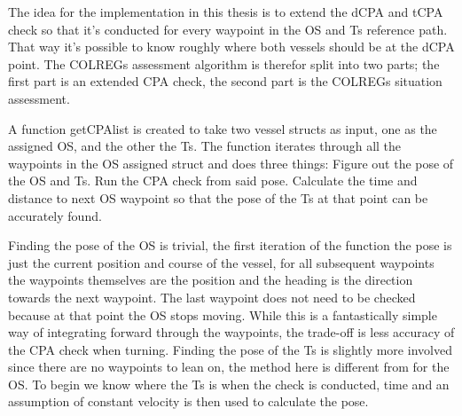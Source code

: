 The idea for the implementation in this thesis is to extend the \gls{dCPA} and \gls{tCPA} check so that it's conducted for every waypoint in the \gls{OS} and \gls{Ts} reference path.
That way it's possible to know roughly where both vessels should be at the \gls{dCPA} point. The COLREGs assessment
algorithm is therefor split into two parts; the first part is an extended CPA check, the second part is the COLREGs situation assessment. 

A function getCPAlist is created to take two vessel structs as input, one as the assigned \gls{OS}, and the other the \gls{Ts}. The function iterates through all the waypoints
in the \gls{OS} assigned struct and does three things:\newline
Figure out the pose of the \gls{OS} and \gls{Ts}.\newline
Run the CPA check from said pose.\newline
Calculate the time and distance to next \gls{OS} waypoint so that the pose of the \gls{Ts} at that point can be accurately found.

Finding the pose of the \gls{OS} is trivial, the first iteration of the function the pose is just the current position and course of the vessel, for all
subsequent waypoints the waypoints themselves are the position and the heading is the direction towards the next waypoint. The last waypoint does not need to be checked
because at that point the \gls{OS} stops moving. While this is a fantastically simple way of integrating forward through the waypoints, the trade-off is less accuracy of the CPA check
when turning. 
Finding the pose of the \gls{Ts} is slightly more involved since there are no waypoints to lean on, the method here is different from for the \gls{OS}.
To begin we know where the \gls{Ts} is when the check is conducted, time and an assumption of constant velocity is then used to calculate the pose.

